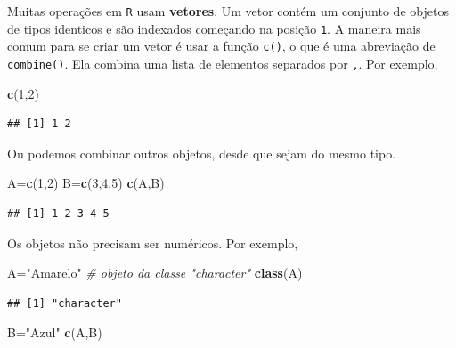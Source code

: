 \documentclass[
]{book}
\newenvironment{Shaded}{\begin{snugshade}}{\end{snugshade}}
\newcommand{\CommentTok}[1]{\textcolor[rgb]{0.56,0.35,0.01}{\textit{#1}}}
\newcommand{\DecValTok}[1]{\textcolor[rgb]{0.00,0.00,0.81}{#1}}
\newcommand{\KeywordTok}[1]{\textcolor[rgb]{0.13,0.29,0.53}{\textbf{#1}}}
\newcommand{\NormalTok}[1]{#1}
\newcommand{\StringTok}[1]{\textcolor[rgb]{0.31,0.60,0.02}{#1}}
\theoremstyle{definition}
\theoremstyle{definition}
\theoremstyle{definition}
\theoremstyle{remark}
\begin{document}
Muitas operações em \texttt{R} usam \textbf{vetores}. Um vetor contém um conjunto de objetos de tipos identicos e são indexados começando na posição \texttt{1}. A maneira mais comum para se criar um vetor é usar a função \texttt{c()}, o que é uma abreviação de \texttt{combine()}. Ela combina uma lista de elementos separados por \texttt{,}. Por exemplo,

\begin{Shaded}
\begin{Highlighting}[]
\KeywordTok{c}\NormalTok{(}\DecValTok{1}\NormalTok{,}\DecValTok{2}\NormalTok{)}
\end{Highlighting}
\end{Shaded}

\begin{verbatim}
## [1] 1 2
\end{verbatim}

Ou podemos combinar outros objetos, desde que sejam do mesmo tipo.

\begin{Shaded}
\begin{Highlighting}[]
\NormalTok{A=}\KeywordTok{c}\NormalTok{(}\DecValTok{1}\NormalTok{,}\DecValTok{2}\NormalTok{)}
\NormalTok{B=}\KeywordTok{c}\NormalTok{(}\DecValTok{3}\NormalTok{,}\DecValTok{4}\NormalTok{,}\DecValTok{5}\NormalTok{)}
\KeywordTok{c}\NormalTok{(A,B)}
\end{Highlighting}
\end{Shaded}

\begin{verbatim}
## [1] 1 2 3 4 5
\end{verbatim}

Os objetos não precisam ser numéricos. Por exemplo,

\begin{Shaded}
\begin{Highlighting}[]
\NormalTok{A=}\StringTok{"Amarelo"}  \CommentTok{# objeto da classe "character"}
\KeywordTok{class}\NormalTok{(A)}
\end{Highlighting}
\end{Shaded}

\begin{verbatim}
## [1] "character"
\end{verbatim}

\begin{Shaded}
\begin{Highlighting}[]
\NormalTok{B=}\StringTok{"Azul"}
\KeywordTok{c}\NormalTok{(A,B)}
\end{Highlighting}
\end{Shaded}
\end{document}
